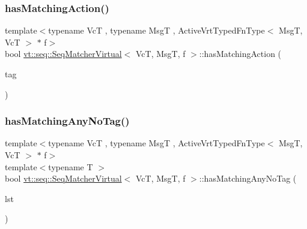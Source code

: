 \mbox{\label{structvt_1_1seq_1_1_seq_matcher_virtual_a9edb994600c8caf416f0d2ae1e4d118e}} 
\subsubsection{\texorpdfstring{has\+Matching\+Action()}{hasMatchingAction()}}
{\footnotesize\ttfamily template$<$typename VcT , typename MsgT , Active\+Vrt\+Typed\+Fn\+Type$<$ Msg\+T, Vc\+T $>$ $\ast$ f$>$ \\
bool \hyperlink{structvt_1_1seq_1_1_seq_matcher_virtual}{vt\+::seq\+::\+Seq\+Matcher\+Virtual}$<$ VcT, MsgT, f $>$\+::has\+Matching\+Action (\begin{DoxyParamCaption}\item[{\hyperlink{namespacevt_a84ab281dae04a52a4b243d6bf62d0e52}{Tag\+Type} const \&}]{tag }\end{DoxyParamCaption})\hspace{0.3cm}{\ttfamily [static]}}

\mbox{\label{structvt_1_1seq_1_1_seq_matcher_virtual_a51876d041e0cd8debc1b1108f6d83bb6}} 
\subsubsection{\texorpdfstring{has\+Matching\+Any\+No\+Tag()}{hasMatchingAnyNoTag()}}
{\footnotesize\ttfamily template$<$typename VcT , typename MsgT , Active\+Vrt\+Typed\+Fn\+Type$<$ Msg\+T, Vc\+T $>$ $\ast$ f$>$ \\
template$<$typename T $>$ \\
bool \hyperlink{structvt_1_1seq_1_1_seq_matcher_virtual}{vt\+::seq\+::\+Seq\+Matcher\+Virtual}$<$ VcT, MsgT, f $>$\+::has\+Matching\+Any\+No\+Tag (\begin{DoxyParamCaption}\item[{\hyperlink{structvt_1_1seq_1_1_seq_matcher_virtual_a1ce5abe53e93d69d1b487e97fd30fdbd}{Seq\+State\+Cont\+Type}$<$ T $>$ \&}]{lst }\end{DoxyParamCaption})\hspace{0.3cm}{\ttfamily [static]}}

